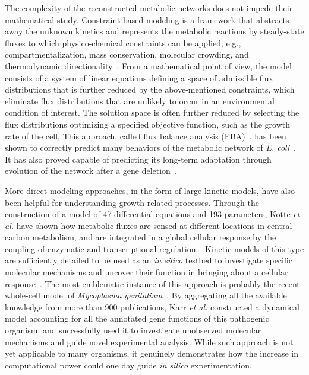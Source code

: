 The complexity of the reconstructed metabolic networks does not impede their mathematical study.
Constraint-based modeling is a framework that abstracts away the unknown kinetics and represents the metabolic reactions by steady-state fluxes to which physico-chemical constraints can be applied, e.g., compartmentalization, mass conservation, molecular crowding, and thermodynamic directionality~\cite{ebrahim_cobrapy_2013}.
From a mathematical point of view, the model consists of a system of linear equations defining a space of admissible flux distributions that is further reduced by the above-mentioned constraints, which eliminate flux distributions that are unlikely to occur in an environmental condition of interest.
The solution space is often further reduced by selecting the flux distributions optimizing a specified objective function, such as the growth rate of the cell.
This approach, called flux balance analysis (FBA)~\cite{orth_comprehensive_2011,palsson_systems_2011}, has been shown to correctly predict many behaviors of the metabolic network of \textit{E. coli}~\cite{varma_stoichiometric_1994,edwards_silico_2001}.
It has also proved capable of predicting its long-term adaptation through evolution of the network after a gene deletion~\cite{fong_metabolic_2004}.

More direct modeling approaches, in the form of large kinetic models, have also been helpful for understanding growth-related processes.
Through the construction of a model of 47 differential equations and 193 parameters, Kotte \textit{et al.} have shown how metabolic fluxes are sensed at different locations in central carbon metabolism, and are integrated in a global cellular response by the coupling of enzymatic and transcriptional regulation~\cite{kotte_bacterial_2010}.
Kinetic models of this type are sufficiently detailed to be used as an \textit{in silico} testbed to investigate specific molecular mechanisms and uncover their function in bringing about a cellular response~\cite{peskov_kinetic_2012}.
The most emblematic instance of this approach is probably the recent whole-cell model of \textit{Mycoplasma genitalium}~\cite{karr_whole-cell_2012}.
By aggregating all the available knowledge from more than 900 publications, Karr \textit{et al.} constructed a dynamical model accounting for all the annotated gene functions of this pathogenic organism, and successfully used it to investigate unobserved molecular mechanisms and guide novel experimental analysis.
While such approach is not yet applicable to many organisms, it genuinely demonstrates how the increase in computational power could one day guide \textit{in silico} experimentation.

